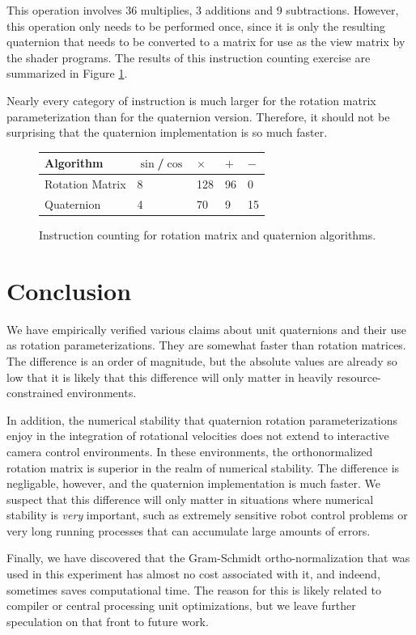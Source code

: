 \documentclass{acm_proc_article-sp}
\begin{document}
This operation involves 36 multiplies, 3 additions and 9 subtractions.
However, this operation only needs to be performed once, since it is only the resulting quaternion that needs to be converted to a matrix for use as the view matrix by the shader programs.
The results of this instruction counting exercise are summarized in Figure \ref{fig:counting}.

Nearly every category of instruction is much larger for the rotation matrix parameterization than for the quaternion version.
Therefore, it should not be surprising that the quaternion implementation is so much faster.

\begin{figure}
\begin{tabular}{l|l|l|l|l}
    Algorithm       & $\sin$/$\cos$  & $\times$      & $+$       & $-$  \\
    \hline
    Rotation Matrix & 8              & 128           & 96        & 0             \\
    Quaternion      & 4              & 70            & 9         & 15            \\

\end{tabular}
\caption{Instruction counting for rotation matrix and quaternion algorithms.}
\label{fig:counting}
\end{figure}

\section{Conclusion}

We have empirically verified various claims about unit quaternions and their use as rotation parameterizations.
They are somewhat faster than rotation matrices.
The difference is an order of magnitude, but the absolute values are already so low that it is likely that this difference will only matter in heavily resource-constrained environments.

In addition, the numerical stability that quaternion rotation parameterizations enjoy in the integration of rotational velocities does not extend to interactive camera control environments.
In these environments, the orthonormalized rotation matrix is superior in the realm of numerical stability.
The difference is negligable, however, and the quaternion implementation is much faster.
We suspect that this difference will only matter in situations where numerical stability is \emph{very} important, such as extremely sensitive robot control problems or very long running processes that can accumulate large amounts of errors.

Finally, we have discovered that the Gram-Schmidt ortho-normalization that was used in this experiment has almost no cost associated with it, and indeend, sometimes saves computational time.
The reason for this is likely related to compiler or central processing unit optimizations, but we leave further speculation on that front to future work.

\printbibliography
\end{document}
